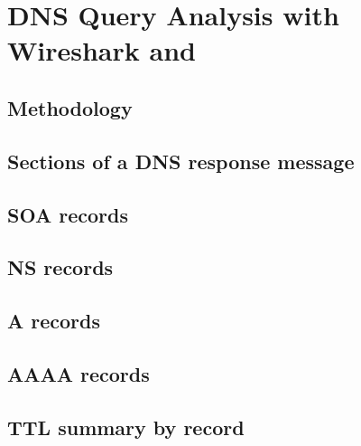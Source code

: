 \section{DNS Query Analysis with Wireshark and }\label{sec:analysis}


\subsection{Methodology}\label{sec:methodology}

\subsection{Sections of a DNS response message}\label{sec:response-sections}

\subsection{SOA records}\label{sec:soa}

\subsection{NS records}\label{sec:ns}

\subsection{A records}\label{sec:a}

\subsection{AAAA records}\label{sec:aaaa}

\subsection{TTL summary by record}\label{sec:ttl}

